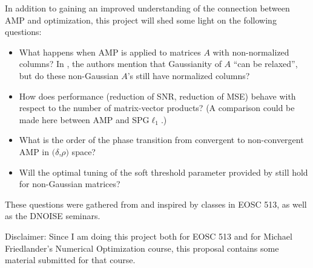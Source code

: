 \documentclass[12pt]{article}
\begin{document}
In addition to gaining an improved understanding of the connection between AMP and optimization, this project will shed some light on the following questions:
\begin{itemize}
\item What happens when AMP is applied to matrices $A$ with non-normalized columns? In \cite{Donoho2009}, the authors mention that Gaussianity of $A$ ``can be relaxed'', but do these non-Gaussian $A$'s still have normalized columns?
\item How does performance (reduction of SNR, reduction of MSE) behave with respect to the number of matrix-vector products? (A comparison could be made here between AMP and SPG$\ell_1$.)
\item What is the order of the phase transition from convergent to non-convergent AMP in $(\delta$,$\rho)$ space?
\item Will the optimal tuning of the soft threshold parameter provided by \cite{Donoho2009} still hold for non-Gaussian matrices?
\end{itemize}

These questions were gathered from and inspired by classes in EOSC 513, as well as the DNOISE seminars.

Disclaimer: Since I am doing this project both for EOSC 513 and for Michael Friedlander's Numerical Optimization course, this proposal contains some material submitted for that course.

{}

\end{document}
